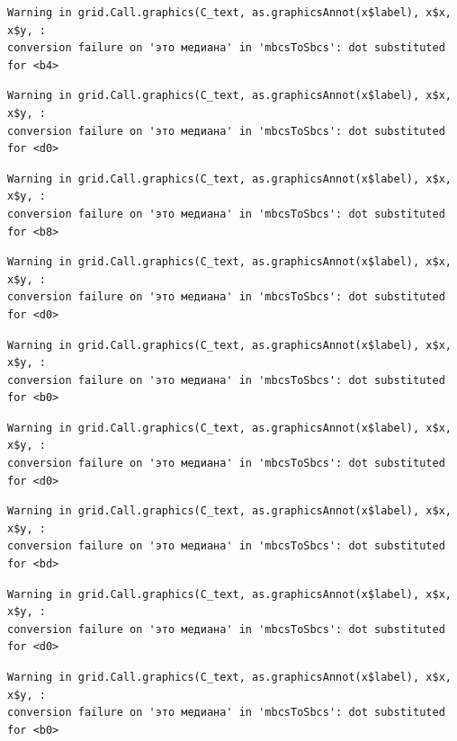 \documentclass[
  letterpaper,
]{scrbook}
\theoremstyle{definition}
\theoremstyle{remark}
\begin{document}
\begin{verbatim}
Warning in grid.Call.graphics(C_text, as.graphicsAnnot(x$label), x$x, x$y, :
conversion failure on 'это медиана' in 'mbcsToSbcs': dot substituted for <b4>
\end{verbatim}

\begin{verbatim}
Warning in grid.Call.graphics(C_text, as.graphicsAnnot(x$label), x$x, x$y, :
conversion failure on 'это медиана' in 'mbcsToSbcs': dot substituted for <d0>
\end{verbatim}

\begin{verbatim}
Warning in grid.Call.graphics(C_text, as.graphicsAnnot(x$label), x$x, x$y, :
conversion failure on 'это медиана' in 'mbcsToSbcs': dot substituted for <b8>
\end{verbatim}

\begin{verbatim}
Warning in grid.Call.graphics(C_text, as.graphicsAnnot(x$label), x$x, x$y, :
conversion failure on 'это медиана' in 'mbcsToSbcs': dot substituted for <d0>
\end{verbatim}

\begin{verbatim}
Warning in grid.Call.graphics(C_text, as.graphicsAnnot(x$label), x$x, x$y, :
conversion failure on 'это медиана' in 'mbcsToSbcs': dot substituted for <b0>
\end{verbatim}

\begin{verbatim}
Warning in grid.Call.graphics(C_text, as.graphicsAnnot(x$label), x$x, x$y, :
conversion failure on 'это медиана' in 'mbcsToSbcs': dot substituted for <d0>
\end{verbatim}

\begin{verbatim}
Warning in grid.Call.graphics(C_text, as.graphicsAnnot(x$label), x$x, x$y, :
conversion failure on 'это медиана' in 'mbcsToSbcs': dot substituted for <bd>
\end{verbatim}

\begin{verbatim}
Warning in grid.Call.graphics(C_text, as.graphicsAnnot(x$label), x$x, x$y, :
conversion failure on 'это медиана' in 'mbcsToSbcs': dot substituted for <d0>
\end{verbatim}

\begin{verbatim}
Warning in grid.Call.graphics(C_text, as.graphicsAnnot(x$label), x$x, x$y, :
conversion failure on 'это медиана' in 'mbcsToSbcs': dot substituted for <b0>
\end{verbatim}
\end{document}
